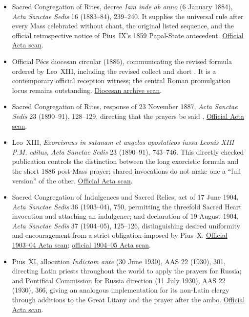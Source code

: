 \begin{itemize}
  \item Sacred Congregation of Rites, decree \emph{Iam inde ab anno} (6 January 1884), \emph{Acta Sanctae Sedis} 16 (1883--84), 239--240. It supplies the universal rule after every Mass celebrated without chant, the original listed sequence, and the official retrospective notice of Pius~IX's 1859 Papal-State antecedent. \href{https://www.vatican.va/archive/ass/documents/ASS-16-1883-84-1-576%2Bsupplemento-17-96-ocr.pdf}{Official Acta scan}.
  \item Official Pécs diocesan circular (1886), communicating the revised formula ordered by Leo~XIII, including the revised collect and short . It is a contemporary official reception witness; the central Roman promulgation locus remains outstanding. \href{https://archivum.pecsiegyhazmegye.hu/images/PEL.I.1.f.1_1886.pdf}{Diocesan archive scan}.
  \item Sacred Congregation of Rites, response of 23 November 1887, \emph{Acta Sanctae Sedis} 23 (1890--91), 128--129, directing that the prayers be said . \href{https://www.vatican.va/archive/ass/documents/ASS-23-1890-91-ocr.pdf}{Official Acta scan}.
  \item Leo~XIII, \emph{Exorcismus in satanam et angelos apostaticos iussu Leonis XIII P.M. editus}, \emph{Acta Sanctae Sedis} 23 (1890--91), 743--746. This directly checked publication controls the distinction between the long exorcistic formula and the short 1886 post-Mass prayer; shared invocations do not make one a ``full version'' of the other. \href{https://www.vatican.va/archive/ass/documents/ASS-23-1890-91-ocr.pdf}{Official Acta scan}.
  \item Sacred Congregation of Indulgences and Sacred Relics, act of 17 June 1904, \emph{Acta Sanctae Sedis} 36 (1903--04), 750, permitting the threefold Sacred Heart invocation and attaching an indulgence; and declaration of 19 August 1904, \emph{Acta Sanctae Sedis} 37 (1904--05), 125--126, distinguishing desired uniformity and encouragement from a strict obligation imposed by Pius~X. \href{https://www.vatican.va/archive/ass/documents/ASS-36-1903-4-ocr.pdf}{Official 1903--04 Acta scan}; \href{https://www.vatican.va/archive/ass/documents/ASS-37-1904-5-ocr.pdf}{official 1904--05 Acta scan}.
  \item Pius~XI, allocution \emph{Indictam ante} (30 June 1930), AAS 22 (1930), 301, directing Latin priests throughout the world to apply the prayers for Russia; and Pontifical Commission for Russia direction (11 July 1930), AAS 22 (1930), 366, giving an analogous implementation for its non-Latin clergy through additions to the Great Litany and the prayer after the ambo. \href{https://www.vatican.va/archive/aas/documents/AAS-22-1930-ocr.pdf}{Official Acta scan}.

\end{itemize}

